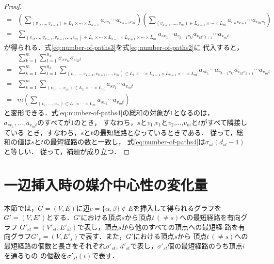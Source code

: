 \begin{proof}
\begin{align}
    =&\left(\sum_{(v_1,\ldots,v_{k-1})\in L_1\times\cdots\times L_{k-1}}
    a_{sv_1}\cdots a_{v_{k-1}v_{kl}}\right)
    \left(\sum_{(v_{k+1},\ldots,v_m)\in L_{k+1}\times\cdots\times L_m}
    a_{v_{kl}v_{k+1}}\cdots a_{v_mv_t}\right)\nonumber\\
    =&\sum_{(v_1,\ldots,v_{k-1},v_{k+1},\ldots,v_m)\in L_1\times\cdots\times L_{k-1}\times L_{k+1}\times\cdots\times L_m}
    a_{sv_1}\cdots a_{v_{k-1}v_{kl}}a_{v_{kl}v_{k+1}}\cdots a_{v_mt}
    \label{eq:number-of-paths3}
  \end{align}
  が得られる．式\eqref{eq:number-of-paths3}を式\eqref{eq:number-of-paths2}に
  代入すると，
  \begin{align}
    &\sum_{k=1}^m\sum_{l=1}^{n_k}\sigma_{sv_{kl}}\sigma_{v_{kl}t}\nonumber\\
    =&\sum_{k=1}^m\sum_{l=1}^{n_k}\sum_{
      (v_1,\ldots,v_{k-1},v_{k+1},\ldots,v_m)\in
      L_1\times\cdots\times L_{k-1}\times L_{k+1}\times\cdots\times L_m
    }a_{sv_1}\cdots a_{v_{k-1}v_{kl}}a_{v_{kl}v_{k+1}}\cdots a_{v_mt}\nonumber\\
    =&\sum_{k=1}^m\sum_{(v_1,\ldots,v_m)\in L_1\times\cdots\times L_m}
    a_{sv_1}\cdots a_{v_mt}\nonumber\\
    =&m\left(\sum_{(v_1,\ldots,v_m)\in L_1\times\cdots\times L_m}
    a_{sv_1}\cdots a_{v_mt}\right)
    \label{eq:number-of-paths4}
  \end{align}
  と変形できる．式\eqref{eq:number-of-paths4}の総和の対象が$1$となるのは，
  $a_{sv_1},\ldots,a_{v_mt}$のすべてが$1$のとき，
  すなわち，$s$と$v_1$,$v_1$と$v_2$,$\ldots$,$v_m$と$t$がすべて隣接している
  とき，すなわち，$s$と$t$の最短経路となっているときである．
  従って，総和の値は$s$と$t$の最短経路の数と一致し，
  式\eqref{eq:number-of-paths4}は$\sigma_{st}(d_{st}-1)$と等しい．
  従って，補題が成り立つ．
\end{proof}

\section{一辺挿入時の媒介中心性の変化量}
\label{sect:update-bc-on-insert}
本節では，$G=(V,E)$に辺$e=\{\alpha,\beta\} \not\in E$を挿入して得られるグラフを
$G'=(V,E')$とする．$G'$における頂点$s$から頂点$t\,(\neq s)$への最短経路を有向グラフ
$G'_{st}=(V'_{st},E'_{st})$で表し，頂点$s$から他のすべての頂点への最短経
路を有向グラフ$G'_s=(V,E'_s)$で表す．また，$G'$における頂点$s$から
頂点$t\,(\neq s)$への最短経路の個数と長さをそれぞれ$\sigma'_{st}$, 
$d'_{st}$で表し，$\sigma'_{st}$個の最短経路のうち頂点$i$を通るもの
の個数を$\sigma'_{st}(i)$で表す．

